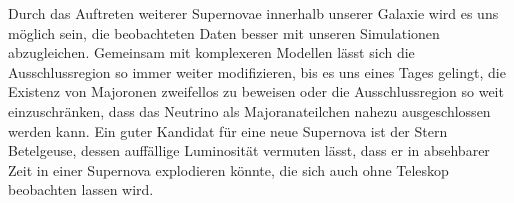 Durch das Auftreten weiterer Supernovae innerhalb unserer Galaxie wird es uns möglich sein, die beobachteten Daten besser mit unseren Simulationen abzugleichen.
Gemeinsam mit komplexeren Modellen lässt sich die Ausschlussregion so immer weiter modifizieren, bis es uns eines Tages gelingt, die Existenz von Majoronen zweifellos zu beweisen oder die
Ausschlussregion so weit einzuschränken, dass das Neutrino als Majoranateilchen nahezu ausgeschlossen werden kann.
Ein guter Kandidat für eine neue Supernova ist der Stern Betelgeuse, dessen auffällige Luminosität vermuten lässt, dass er in absehbarer Zeit in einer Supernova explodieren könnte, die sich auch ohne Teleskop beobachten lassen wird.




